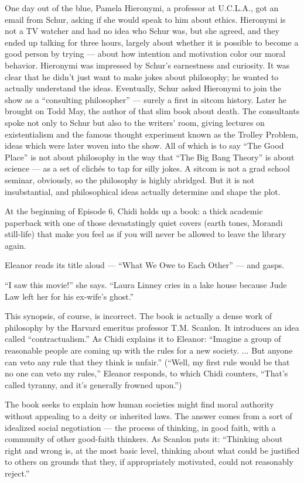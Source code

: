 One day out of the blue, Pamela Hieronymi, a professor at U.C.L.A., got
an email from Schur, asking if she would speak to him about ethics.
Hieronymi is not a TV watcher and had no idea who Schur was, but she
agreed, and they ended up talking for three hours, largely about whether
it is possible to become a good person by trying --- about how intention
and motivation color our moral behavior. Hieronymi was impressed by
Schur's earnestness and curiosity. It was clear that he didn't just want
to make jokes about philosophy; he wanted to actually understand the
ideas. Eventually, Schur asked Hieronymi to join the show as a
``consulting philosopher'' --- surely a first in sitcom history. Later
he brought on Todd May, the author of that slim book about death. The
consultants spoke not only to Schur but also to the writers' room,
giving lectures on existentialism and the famous thought experiment
known as the Trolley Problem, ideas which were later woven into the
show. All of which is to say ``The Good Place'' is not about philosophy
in the way that ``The Big Bang Theory'' is about science --- as a set of
clichés to tap for silly jokes. A sitcom is not a grad school seminar,
obviously, so the philosophy is highly abridged. But it is not
insubstantial, and philosophical ideas actually determine and shape the
plot.

At the beginning of Episode 6, Chidi holds up a book: a thick academic
paperback with one of those devastatingly quiet covers (earth tones,
Morandi still-life) that make you feel as if you will never be allowed
to leave the library again.

Eleanor reads its title aloud --- ``What We Owe to Each Other'' --- and
gasps.

``I saw this movie!'' she says. ``Laura Linney cries in a lake house
because Jude Law left her for his ex-wife's ghost.''

This synopsis, of course, is incorrect. The book is actually a dense
work of philosophy by the Harvard emeritus professor T.M. Scanlon. It
introduces an idea called ``contractualism.'' As Chidi explains it to
Eleanor: ``Imagine a group of reasonable people are coming up with the
rules for a new society. ... But anyone can veto any rule that they
think is unfair.'' (``Well, my first rule would be that no one can veto
my rules,'' Eleanor responds, to which Chidi counters, ``That's called
tyranny, and it's generally frowned upon.'')

The book seeks to explain how human societies might find moral authority
without appealing to a deity or inherited laws. The answer comes from a
sort of idealized social negotiation --- the process of thinking, in
good faith, with a community of other good-faith thinkers. As Scanlon
puts it: ``Thinking about right and wrong is, at the most basic level,
thinking about what could be justified to others on grounds that they,
if appropriately motivated, could not reasonably reject.''

